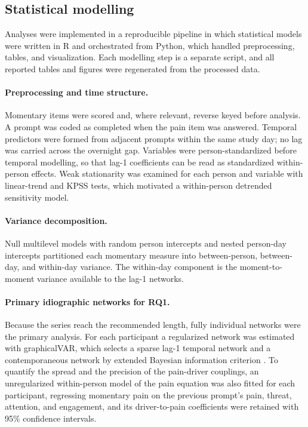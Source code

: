 \documentclass[11pt,a4paper]{article}
\begin{document}
\subsection{Statistical modelling}
Analyses were implemented in a reproducible pipeline in which statistical models were written in
\textsf{R} \citep{rcoreteam2024} and orchestrated from \textsf{Python}, which handled
preprocessing, tables, and visualization. Each modelling step is a separate script, and all
reported tables and figures were regenerated from the processed data.

\paragraph{Preprocessing and time structure.} Momentary items were scored and, where relevant,
reverse keyed before analysis. A prompt was coded as completed when the pain item was answered.
Temporal predictors were formed from adjacent prompts within the same study day; no lag was
carried across the overnight gap. Variables were person-standardized before temporal modelling,
so that lag-1 coefficients can be read as standardized within-person effects. Weak stationarity
was examined for each person and variable with linear-trend and KPSS tests, which motivated a
within-person detrended sensitivity model.

\paragraph{Variance decomposition.} Null multilevel models with random person intercepts and
nested person-day intercepts \citep{bates2015lme4} partitioned each momentary measure into
between-person, between-day, and within-day variance. The within-day component is the
moment-to-moment variance available to the lag-1 networks.

\paragraph{Primary idiographic networks for RQ1.} Because the series reach the recommended
length, fully individual networks were the primary analysis. For each participant a regularized
network was estimated with graphicalVAR, which selects a sparse lag-1 temporal network and a
contemporaneous network by extended Bayesian information criterion \citep{epskamp2018tutorial}.
To quantify the spread and the precision of the pain-driver couplings, an unregularized
within-person model of the pain equation was also fitted for each participant, regressing
momentary pain on the previous prompt's pain, threat, attention, and engagement, and its
driver-to-pain coefficients were retained with 95\% confidence intervals.
\end{document}
